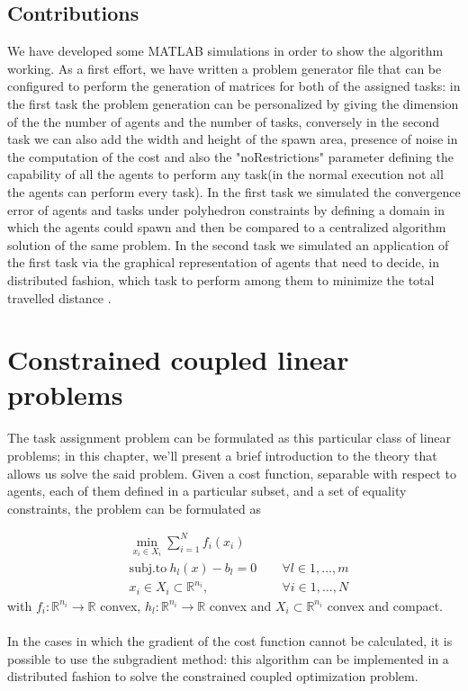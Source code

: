 \documentclass{article}
\begin{document}
\subsection{Contributions}
We have developed some MATLAB simulations in order to show the algorithm working.
As a first effort, we have written a problem generator file that can be configured to perform the generation of matrices for both of the assigned tasks: in the first task the problem generation can be personalized by giving the dimension of the  the number of agents and the number of tasks, conversely in the second task we can also add the width and height of the spawn area, presence of noise in the computation of the cost and also the "noRestrictions" parameter defining the capability of all the agents to perform any task(in the normal execution not all the agents can perform every task).
In the first task we simulated the convergence error of agents and tasks under polyhedron constraints by defining a domain in which the agents could spawn and then be compared to a centralized algorithm solution of the same problem.
In the second task we simulated an application of the first task via the graphical representation of agents that need to decide, in distributed fashion, which task to perform among them to minimize the total travelled distance . 


\section{Constrained coupled linear problems} 
The task assignment problem can be formulated as this particular class of linear problems; in this chapter, we'll present a brief introduction to the theory that allows us solve the said problem. Given a cost function, separable with respect to agents, each of them defined in a particular subset, and a set of equality constraints, the problem can be formulated as 

\begin{align}
  &\min_{x_i\in X_i} \sum_{i=1}^{N} f_i(x_i) \\
  &\text{subj.to} \   h_l(x)-b_l=0 \ &\quad \forall l \in {1,\dots, m} \\
  & x_i\in X_i \subset \mathbb R^{n_i} , &\quad \forall i \in {1,\dots, N}
\end{align}
with ${f_i:\mathbb R^{n_i} \rightarrow \mathbb R }$ convex, ${h_l:\mathbb R^{n_i} \rightarrow \mathbb R}$ convex and ${X_i \subset \mathbb R^{n_i}}$ convex and compact.\\
\\
In the cases in which the gradient of the cost function cannot be calculated, it is possible to use the subgradient method: this algorithm can be implemented in a distributed fashion to solve the constrained coupled optimization problem.
\end{document}
